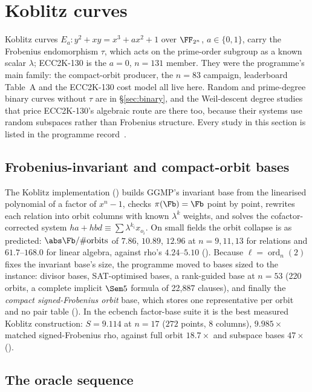 \chapter{Koblitz curves}\label{sec:koblitz}

Koblitz curves $E_a: y^2+xy=x^3+ax^2+1$ over $\FF_{2^n}$, $a\in\{0,1\}$, carry
the Frobenius endomorphism $\tau$, which acts on the prime-order subgroup as
a known scalar $\lambda$; ECC2K-130 is the $a=0$, $n=131$ member. They were
the programme's main family: the compact-orbit producer, the $n=83$
campaign, leaderboard Table~A and the ECC2K-130 cost model all live here.
Random and prime-degree binary curves without $\tau$ are in
\S\ref{sec:binary}, and the Weil-descent degree studies that price
ECC2K-130's algebraic route are there too, because their systems use random
subspaces rather than Frobenius structure. Every study in this section is
listed in the programme record~\cite{icprogram2026}.

\section{Frobenius-invariant and compact-orbit bases}

The Koblitz implementation ()
builds GGMP's invariant base from the linearised polynomial of a factor of
$x^n-1$, checks $\pi(\Fb)=\Fb$ point by point, rewrites each relation into
orbit columns with known $\lambda^k$ weights, and solves the
cofactor-corrected system $h a+hbd\equiv\sum\lambda^{k_i}x_{o_i}$. On
small fields the orbit collapse is as predicted: $\abs\Fb/\#\text{orbits}$
of $7.86$, $10.89$, $12.96$ at $n=9,11,13$ for relations and
$61.7$--$168.0$ for linear algebra, against rho's $4.24$--$5.10$
(). Because $\ell=\operatorname{ord}_n(2)$
fixes the invariant base's size, the programme moved to bases sized to the
instance: divisor bases, SAT-optimised bases, a rank-guided base at $n=53$
(220 orbits, a complete implicit $\Sem5$ formula of 22{,}887 clauses), and
finally the \emph{compact signed-Frobenius orbit} base, which stores one
representative per orbit and no pair table
(). In the ecbench factor-base
suite it is the best measured Koblitz construction: $S=9.114$ at $n=17$
($272$ points, 8 columns), $9.985\times$ matched signed-Frobenius rho,
against full orbit $18.7\times$ and subspace bases $47\times$
().

\section{The oracle sequence}

